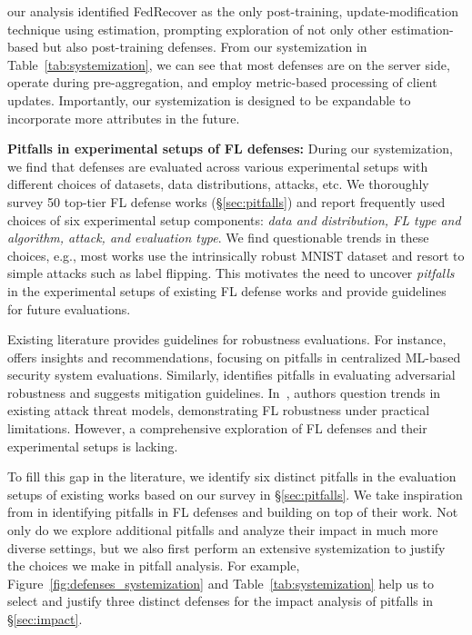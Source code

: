 our analysis identified FedRecover as the only post-training, update-modification technique using estimation, prompting exploration of not only other estimation-based but also post-training defenses. From our systemization in Table~\ref{tab:systemization}, we can see that most defenses are on the server side, operate during pre-aggregation, and employ metric-based processing of client updates. Importantly, our systemization is designed to be expandable to incorporate more attributes in the future.

\noindent\textbf{Pitfalls in experimental setups of FL defenses: }
During our systemization, we find that defenses are evaluated across various experimental setups with different choices of datasets, data distributions, attacks, etc. We thoroughly survey 50 top-tier FL defense works (\S\ref{sec:pitfalls}) and report frequently used choices of six experimental setup components: \emph{data and distribution, FL type and algorithm, attack, and evaluation type}. We find questionable trends in these choices, e.g., most works use the intrinsically robust MNIST dataset and resort to simple attacks such as label flipping. This motivates the need to uncover \emph{pitfalls} in the experimental setups of existing FL defense works and provide guidelines for future evaluations.


Existing literature provides guidelines for robustness evaluations. For instance, \cite{arp2022and} offers insights and recommendations, focusing on pitfalls in centralized ML-based security system evaluations. Similarly, \cite{carlini2019evaluating} identifies pitfalls in evaluating adversarial robustness and suggests mitigation guidelines. In~\cite{shejwalkar2022back}, authors question trends in existing attack threat models, demonstrating FL robustness under practical limitations. However, a comprehensive exploration of FL defenses and their experimental setups is lacking.

To fill this gap in the literature, we identify six distinct pitfalls in the evaluation setups of existing works based on our survey in \S\ref{sec:pitfalls}. We take inspiration from \cite{khan2023pitfalls} in identifying pitfalls in FL defenses and building on top of their work. Not only do we explore additional pitfalls and analyze their impact in much more diverse settings, but we also first perform an extensive systemization to justify the choices we make in pitfall analysis. For example, Figure~\ref{fig:defenses_systemization} and Table~\ref{tab:systemization} help us to select and justify three distinct defenses for the impact analysis of pitfalls in \S\ref{sec:impact}.


